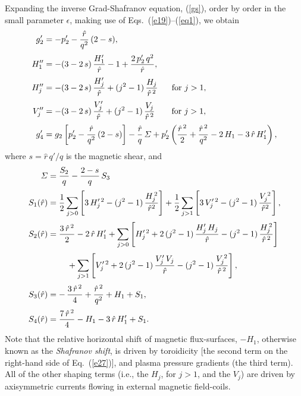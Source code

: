 \documentclass[12pt,prb,aps]{revtex4-1}
\begin{document}
Expanding the inverse Grad-Shafranov equation, (\ref{gs}), order by order in the
small parameter $\epsilon$, making use of Eqs.~(\ref{e19})--(\ref{eq1}), we obtain\,\cite{am1,tj,tj1}
\begin{align}
g_2'&=- p_2' - \frac{\hat{r}}{q^2}\,(2-s),\label{e26}\\[0.5ex]
H_1''&= -(3-2\,s)\,\frac{H_1' }{\hat{r}}
-1+\frac{2\,p_2'\,q^2}{\hat{r}},\label{e27}\\[0.5ex]
H_j''&= -(3-2\,s)\,\frac{H_j'}{\hat{r}}+(j^2-1)\,\frac{H_j}{\hat{r}^{\,2}}~~~~~\mbox{for $j>1$},\label{e33x}\\[0.5ex]
V_j''&= -(3-2\,s)\,\frac{V_j'}{\hat{r}}+(j^2-1)\,\frac{V_j}{\hat{r}^{\,2}}~~~~~~\mbox{for $j>1$},\label{e28}\\[0.5ex]
g_4'&= g_2\left[p_2' - \frac{\hat{r}}{q^2}\,(2-s)\right] - \frac{\hat{r}}{q}\,{\mit\Sigma}
+p_2'\left(\frac{\hat{r}^{\,2}}{2}+\frac{\hat{r}^{\,2}}{q^2}-2\,H_1-3\,\hat{r}\,H_1'\right),\label{e31}
\end{align}
where $s=\hat{r}\,q'/q$ is the magnetic shear, and  
\begin{align}{\mit\Sigma} &=\frac{S_2}{q}- \frac{2-s}{q}\,S_3\\[0.5ex]
S_1(\hat{r})&=\frac{1}{2}\sum_{j>0} \left[3\,H_j'^{\,2} -(j^2-1)\,\frac{H_j^{\,2}}{\hat{r}^2}\right]
 +\frac{1}{2}\sum_{j>1} \left[3\,V_j'^{\,2} -(j^2-1)\,\frac{V_j^{\,2}}{\hat{r}^2}\right],\label{e109}
\\[0.5ex]
S_2(\hat{r})&=\frac{3\,\hat{r}^{\,2}}{2} -2\,\hat{r}\,H_1'+\sum_{j>0}\left[H_j'^{\,2}+2\,(j^2-1)\,\frac{H_j'\,H_j}{\hat{r}}-(j^2-1)\,\frac{H_j^{\,2}}{\hat{r}^{\,2}}\right]\nonumber\\[0.5ex]
&\phantom{===}+\sum_{j>1}\left[V_j'^{\,2}+2\,(j^2-1)\,\frac{V_j'\,V_j}{\hat{r}}-(j^2-1)\,\frac{V_j^{\,2}}{\hat{r}^{\,2}}\right],\\[0.5ex]
S_3(\hat{r})&=-\,\frac{3\,\hat{r}^{\,2}}{4}+\frac{\hat{r}^{\,2}}{q^2} +H_1+S_1,\\[0.5ex]
S_4(\hat{r}) &= \frac{7\,\hat{r}^{\,2}}{4}-H_1 -3\,\hat{r}\,H_1' + S_1.
\end{align}
Note that the relative horizontal shift of magnetic flux-surfaces, $-H_1$, otherwise known as the {\em Shafranov shift}, is driven by toroidicity [the second term on
the right-hand side of Eq.~(\ref{e27})], and plasma pressure gradients (the third term). All of the other shaping terms (i.e., the $H_j$, for $j>1$, and
the $V_j$) are driven by axisymmetric currents flowing in external  magnetic field-coils.
\end{document}

